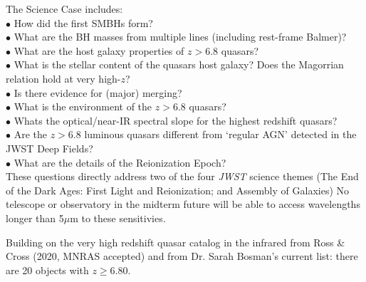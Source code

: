 \documentclass[12pt]{article}
\begin{document}
\smallskip
\smallskip
\noindent
The Science Case includes: \\
$\bullet$ How did the first SMBHs form? \\
$\bullet$ What are the BH masses from multiple lines (including rest-frame Balmer)? \\
$\bullet$ What are the host galaxy properties of $z>6.8$ quasars?  \\ %
$\bullet$ What is the stellar content of the quasars host galaxy? Does the Magorrian relation hold at very high-$z$? \\
$\bullet$ Is there evidence for (major) merging? \\
$\bullet$ What is the environment of the $z>6.8$ quasars?  \\   %
$\bullet$ Whats the optical/near-IR spectral slope for the highest redshift quasars? \\
$\bullet$ Are the $z>6.8$ luminous quasars different from `regular AGN' detected in  the JWST Deep Fields? \\
$\bullet$ What are the details of the Reionization Epoch? \\



These questions directly address two of the four {\it JWST} science themes
(The End of the Dark Ages: First Light and Reionization; %
and Assembly of Galaxies) %
%
No telescope or observatory in the midterm future will be able to access wavelengths longer than
5$\mu$m to these sensitivies. 

Building on the very high redshift quasar catalog in the infrared from
Ross \& Cross (2020, MNRAS accepted) and from Dr. Sarah Bosman’s current list: 
there are 20 objects with $z \geq 6.80$. 

\end{document}
